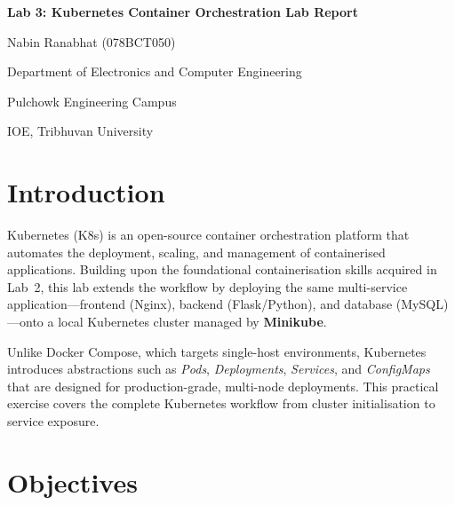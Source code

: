 \documentclass[12pt,a4paper]{article}
\begin{document}

\begin{titlepage}
  \centering
  \vspace*{2cm}
  {\LARGE\bfseries Lab 3: Kubernetes Container Orchestration Lab Report\par}
  \vspace{1.5cm}
  {\large Nabin Ranabhat (078BCT050)\par}
  \vspace{0.5cm}
  {\large Department of Electronics and Computer Engineering\par}
  \vspace{0.5cm}
    {\large Pulchowk Engineering Campus\par}
    {\large IOE, Tribhuvan University\par}
  \vfill
\end{titlepage}

\tableofcontents
\newpage

\section{Introduction}

Kubernetes (K8s) is an open-source container orchestration platform that automates
the deployment, scaling, and management of containerised applications. Building upon
the foundational containerisation skills acquired in Lab~2, this lab extends the
workflow by deploying the same multi-service application---frontend (Nginx),
backend (Flask/Python), and database (MySQL)---onto a local Kubernetes cluster
managed by \textbf{Minikube}.

Unlike Docker Compose, which targets single-host environments, Kubernetes introduces
abstractions such as \textit{Pods}, \textit{Deployments}, \textit{Services}, and
\textit{ConfigMaps} that are designed for production-grade, multi-node deployments.
This practical exercise covers the complete Kubernetes workflow from cluster
initialisation to service exposure.

\section{Objectives}
\end{document}
